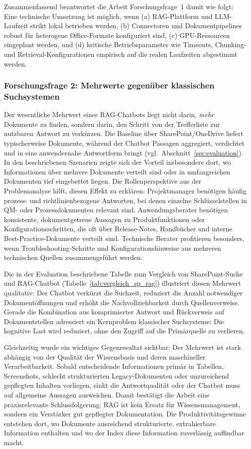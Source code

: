 Zusammenfassend beantwortet die Arbeit Forschungsfrage~1 damit wie folgt:
Eine technische Umsetzung ist möglich, wenn (a) RAG-Plattform und LLM-Laufzeit strikt lokal betrieben werden, (b) Connectoren und Dokumentpipelines robust für heterogene Office-Formate konfiguriert sind, (c) GPU-Ressourcen eingeplant werden, und (d) kritische Betriebsparameter wie Timeouts, Chunking- und Retrieval-Konfigurationen empirisch auf die realen Laufzeiten abgestimmt werden.

\subsubsection{Forschungsfrage 2: Mehrwerte gegenüber klassischen Suchsystemen}

Der wesentliche Mehrwert eines RAG-Chatbots liegt nicht darin, \emph{mehr} Dokumente zu finden, sondern darin, den Schritt von der Trefferliste zur nutzbaren Antwort zu verkürzen.
Die Baseline über SharePoint/OneDrive liefert typischerweise Dokumente, während der Chatbot Passagen aggregiert, verdichtet und in eine anwendernahe Antwortform bringt (vgl.\ Abschnitt~\ref{sec:evaluation}).
In den beschriebenen Szenarien zeigte sich der Vorteil insbesondere dort, wo Informationen über mehrere Dokumente verteilt sind oder in umfangreichen Dokumenten tief eingebettet liegen.
Die Rollenperspektive aus der Problemanalyse hilft, diesen Effekt zu erklären:
Projektmanager benötigen häufig prozess- und richtlinienbezogene Antworten, bei denen einzelne Schlüsselstellen in QM- oder Prozessdokumenten relevant sind.
Anwendungsberater benötigen konsistente, dokumentgetreue Aussagen zu Produktfunktionen oder Konfigurationsschritten, die oft über Release-Notes, Handbücher und interne Best-Practice-Dokumente verteilt sind.
Technische Berater profitieren besonders, wenn Troubleshooting-Schritte und Konfigurationshinweise aus mehreren technischen Quellen zusammengeführt werden.

Die in der Evaluation beschriebene Tabelle zum Vergleich von SharePoint-Suche und RAG-Chatbot (Tabelle~\ref{tab:vergleich_sp_rag}) illustriert diesen Mehrwert qualitativ:
Der Chatbot verkürzt die Suchzeit, reduziert die Anzahl notwendiger Dokumentöffnungen und erhöht die Nachvollziehbarkeit durch Quellenverweise.
Gerade die Kombination aus komprimierter Antwort und Rückverweis auf Dokumentstellen adressiert ein Kernproblem klassischer Suchsysteme: Die kognitive Last wird reduziert, ohne den Zugriff auf die Primärquelle zu verlieren.

Gleichzeitig wurde ein wichtiges Gegenresultat sichtbar:
Der Mehrwert ist stark abhängig von der Qualität der Wissensbasis und deren maschineller Verarbeitbarkeit.
Sobald entscheidende Informationen primär in Tabellen, Screenshots, schlecht strukturierten Legacy-Dokumenten oder unzureichend gepflegten Inhalten vorliegen, sinkt die Antwortqualität oder der Chatbot muss auf allgemeine Aussagen ausweichen.
Damit bestätigt die Arbeit eine praxisrelevante Schlussfolgerung:
RAG ist kein Ersatz für Wissensmanagement, sondern ein Verstärker gut gepflegter Dokumentation.
Die Produktivitätsgewinne entstehen dort, wo Dokumente ausreichend strukturierte, extrahierbare Information enthalten und wo der Index diese Information zuverlässig auffindbar macht.

